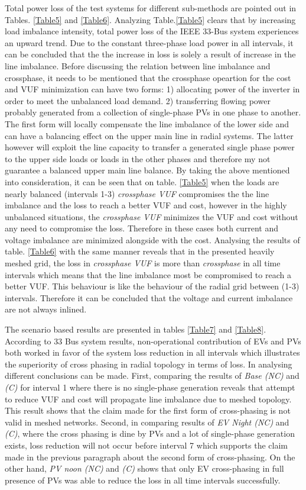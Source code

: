 \documentclass[journal]{IEEEtran}
\begin{document}
Total power loss of the test systems for different sub-methods are pointed out in Tables. \ref{Table5} and \ref{Table6}. Analyzing Table.\ref{Table5} clears that by increasing load imbalance intensity, total power loss of the IEEE 33-Bus system experiences an upward trend. Due to the constant three-phase load power in all intervals, it can be concluded that the the increase in loss is solely a result of increase in the line imbalance. Before discussing the relation between line imbalance and crossphase, it needs to be mentioned that the crossphase opeartion for the cost and VUF minimization can have two forms: 1) allocating power of the inverter in order to meet the unbalanced load demand. 2) transferring flowing power probably generated from a collection of single-phase PVs in one phase to another. The first form will locally compensate the line imbalance of the lower side and can have a balancing effect on the upper main line in radial systems. The latter however will exploit the line capacity to transfer a generated single phase power to the upper side loads or loads in the other phases and therefore my not guarantee a balanced upper main line balance. By taking the above mentioned into consideration, it can be seen that on table. \ref{Table5} when the loads are nearly balanced (intervals 1-3) \textit{crossphase VUF} compromises the the line imbalance and the loss to reach a better VUF and cost, however in the highly unbalanced situations, the \textit{crossphase VUF} minimizes the VUF and cost without any need to compromise the loss. Therefore in these cases both current and voltage imbalance are minimized alongside with the cost. Analysing the results of table. \ref{Table6} with the same manner reveals that in the presented heavily meshed grid, the loss in \textit{crossphase VUF} is more than \textit{crossphase} in all time intervals which means that the line imbalance most be compromised to reach a better VUF. This behaviour is like the behaviour of the radial grid between (1-3) intervals. Therefore it can be concluded that the voltage and current imbalance are not always inlined.

The scenario based results are presented in tables \ref{Table7} and \ref{Table8}. According to 33 Bus system results, non-operational contribution of EVs and PVs both worked in favor of the system loss reduction in all intervals which illustrates the superiority of cross phasing in radial topology in terms of loss. In analysing different conclusions can be made. First, comparing the results of \textit{Base (NC)} and \textit{(C)} for interval 1 where there is no single-phase generation reveals that attempt to reduce VUF and cost will propagate line imbalance due to meshed topology. This result shows that the claim made for the first form of cross-phasing is not valid in meshed networks. Second, in comparing results of \textit{EV Night (NC)} and \textit{(C)}, where the cross phasing is dine by PVs and a lot of single-phase generation exists, loss reduction will not occur before interval 7 which supports the claim made in the previous paragraph about the second form of cross-phasing. On the other hand, \textit{ PV noon (NC)} and \textit{(C)} shows that only EV cross-phasing in full presence of PVs was able to reduce the loss in all time intervals successfully. 
\end{document}
